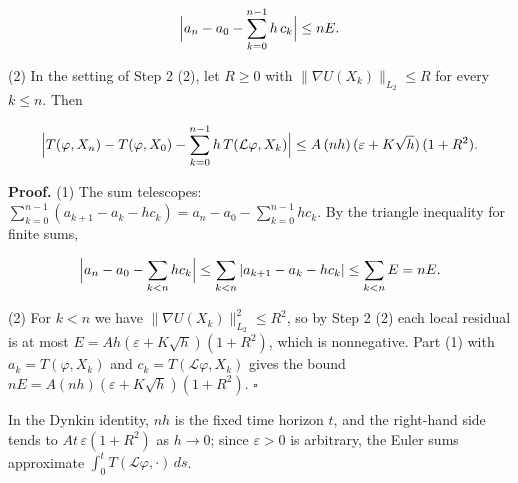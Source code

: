 \documentclass[11pt,a4paper]{report}
\begin{document}
\[\Bigl|a_n-a_0-\sum_{k=0}^{n-1}h\,c_k\Bigr|\le nE.\]


(2) In the setting of Step 2 (2), let \(R\ge0\) with \(\|\nabla U(X_k)\|_{L_2}\le R\) for every \(k\le n\). Then


\[\Bigl|T(\varphi,X_n)-T(\varphi,X_0)-\sum_{k=0}^{n-1}h\,T(\mathcal L\varphi,X_k)\Bigr|\le A\,(nh)\,(\varepsilon+K\sqrt h)\,(1+R^2).\]


\textbf{Proof.} (1) The sum telescopes: \(\sum_{k=0}^{n-1}(a_{k+1}-a_k-hc_k)=a_n-a_0-\sum_{k=0}^{n-1}hc_k\). By the triangle inequality for finite sums,


\[\Bigl|a_n-a_0-\sum_{k<n}hc_k\Bigr|\le\sum_{k<n}|a_{k+1}-a_k-hc_k|\le\sum_{k<n}E=nE.\]


(2) For \(k<n\) we have \(\|\nabla U(X_k)\|_{L_2}^2\le R^2\), so by Step 2 (2) each local residual is at most \(E=Ah(\varepsilon+K\sqrt h)(1+R^2)\), which is nonnegative. Part (1) with \(a_k=T(\varphi,X_k)\) and \(c_k=T(\mathcal L\varphi,X_k)\) gives the bound \(nE=A(nh)(\varepsilon+K\sqrt h)(1+R^2)\). \(\square\)




In the Dynkin identity, \(nh\) is the fixed time horizon \(t\), and the right-hand side tends to \(At\,\varepsilon(1+R^2)\) as \(h\to0\); since \(\varepsilon>0\) is arbitrary, the Euler sums approximate \(\int_0^tT(\mathcal L\varphi,\cdot)\,ds\).
\end{document}
